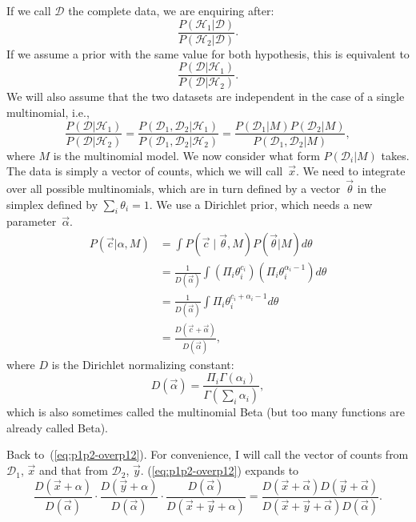 \documentclass{article}
\let\product\Pi
\begin{document}
If we call $\mathcal{D}$ the complete data, we are enquiring after:
\begin{equation}
\frac{P(\mathcal{H}_1|\mathcal{D})}{P(\mathcal{H}_2|\mathcal{D})}.
\label{eq:odds}
\end{equation}
If we assume a prior with the same value for both hypothesis, this is equivalent to
\begin{equation}
\frac{P(\mathcal{D}|\mathcal{H}_1)}{P(\mathcal{D}|\mathcal{H}_2)}.
\label{eq:odds-reversed}
\end{equation}
We will also assume that the two datasets are independent in the case of a single multinomial, i.e.,
\begin{equation}
\frac{P(\mathcal{D}|\mathcal{H}_1)}{P(\mathcal{D}|\mathcal{H}_2)} =
\frac{P(\mathcal{D}_1,\mathcal{D}_2|\mathcal{H}_1)}{P(\mathcal{D}_1,\mathcal{D}_2|\mathcal{H}_2)} =
\frac{P(\mathcal{D}_1|M)P(\mathcal{D}_2|M)}{P(\mathcal{D}_1,\mathcal{D}_2|M)},
\label{eq:p1p2-overp12}
\end{equation}
where $M$ is the multinomial model. We now consider what form
$P(\mathcal{D}_i|M)$ takes. The data is simply a vector of counts, which we
will call~$\vec x$. We need to integrate over all possible multinomials, which
are in turn defined by a vector~$\vec\theta$ in the simplex defined by $\sum_i
\theta_i = 1$. We use a Dirichlet prior, which needs a new parameter~$\vec\alpha$.
\begin{align}
P(\vec{c}|\alpha,M)
    &= \int P\left(\vec{c} \mid \vec{\theta},M\right)P(\vec{\theta}|M) d\theta \\
    &= \frac{1}{D(\vec{\alpha})}{\int (\product_i \theta_i^{c_i})(\product_i \theta_i^{\alpha_i-1}) d\theta} \\
    &= \frac{1}{D(\vec{\alpha})}{\int \product_i \theta_i^{c_i + \alpha_i - 1} d\theta} \\
    &= \frac{D(\vec{c} + \vec{\alpha})}{D(\vec{\alpha})},
\end{align}
where $D$ is the Dirichlet normalizing constant:
\begin{equation}
D(\vec{\alpha}) = \frac{\product_i \Gamma(\alpha_i)}{\Gamma(\sum_i \alpha_i)},
\end{equation}
which is also sometimes called the multinomial Beta (but too many functions are
already called Beta).

Back to~(\ref{eq:p1p2-overp12}). For convenience, I will call the vector of
counts from $\mathcal{D}_1$, $\vec{x}$ and that from $\mathcal{D}_2$, $\vec{y}$.
(\ref{eq:p1p2-overp12}) expands to
\begin{equation}
\frac{D(\vec{x}+\alpha)}{D(\vec{\alpha})}\cdot
    \frac{D(\vec{y}+\alpha)}{D(\vec{\alpha})}\cdot
    \frac{D(\vec{\alpha})}{D(\vec{x}+\vec{y}+\alpha)} =
\frac{D(\vec{x}+\vec{\alpha})D(\vec{y}+\vec\alpha)}{D(\vec{x}+\vec{y}+\vec\alpha) D(\vec\alpha)}.
\end{equation}
\end{document}
